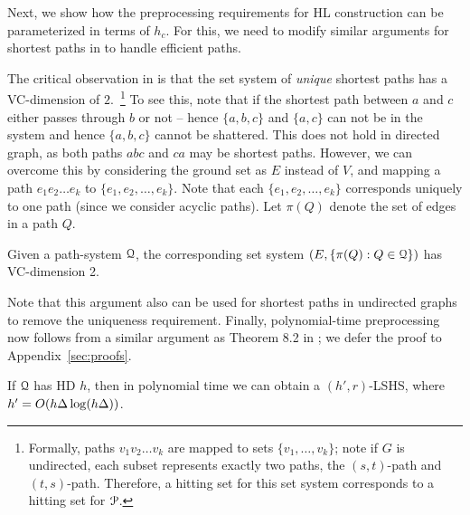 Next, we show how the preprocessing requirements for HL construction can be parameterized in terms of $h_c$. For this, we need to modify similar arguments for shortest paths in \cite{highway2013} to handle efficient paths.

The critical observation in \cite{highway2013} is that the set system of \emph{unique} shortest paths has a VC-dimension of $2$.~\footnote{
Formally, paths $v_1v_2\ldots v_k$ are mapped to sets $\{v_1,\ldots,v_k\}$; note if $G$ is undirected, each subset represents exactly two paths, the $(s,t)$-path and $(t,s)$-path. Therefore, a hitting set for this set system corresponds to a hitting set for $\mathcal{P}$.}
To see this, note that if the shortest path between $a$ and $c$ either passes through $b$ or not -- hence $\{a,b,c\}$ and $\{a,c\}$ can not be in the system and hence $\{a,b,c\}$ cannot be shattered.
This does not hold in directed graph, as both paths $abc$ and $ca$ may be shortest paths. However, we can overcome this by considering the ground set as $E$ instead of $V$, and mapping a path $e_1e_2\ldots e_k$ to $\{e_1,e_2,\ldots,e_k\}$.
Note that each $\{e_1,e_2,\ldots,e_k\}$ corresponds uniquely to one path (since we consider acyclic paths).
Let $\pi(Q)$ denote the set of edges in a path $Q$.
\begin{proposition}
Given a path-system $\mathcal{Q}$, the corresponding set system $(E,\{\pi(Q):Q\in\mathcal{Q}\})$ has VC-dimension 2.
\end{proposition}
Note that this argument also can be used for shortest paths in undirected graphs to remove the uniqueness requirement.
Finally, polynomial-time preprocessing now follows from a similar argument as Theorem 8.2 in \cite{highway2013}; we defer the proof to Appendix~\ref{sec:proofs}.

\begin{proposition}\label{prop:poly_lshs}
If $\mathcal{Q}$ has HD $h$, then in polynomial time we can obtain a $(h',r)$-LSHS, where $h'=O(h\Delta\log(h\Delta))$.	
\end{proposition}
